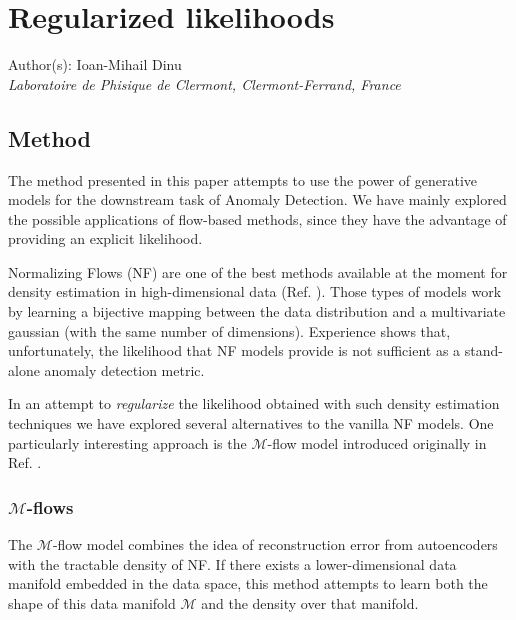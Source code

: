 \documentclass[letterpaper,11pt]{article}
\begin{document}
\section*{Regularized likelihoods}
Author(s): Ioan-Mihail Dinu \\ \textit{Laboratoire de Phisique de Clermont, Clermont-Ferrand, France}\\

\subsection{Method}
\label{sec:method}
The method presented in this paper attempts to use the power of generative models for the downstream task of Anomaly Detection. We have mainly explored the possible applications of flow-based methods, since they have the advantage of providing an explicit likelihood.

Normalizing Flows (NF) are one of the best methods available at the moment for density estimation in high-dimensional data (Ref. \cite{pmlr-v37-rezende15}). Those types of models work by learning a bijective mapping between the data distribution and a multivariate gaussian (with the same number of dimensions). Experience shows that, unfortunately, the likelihood that NF models provide is not sufficient as a stand-alone anomaly detection metric. 

In an attempt to \textit{regularize} the likelihood obtained with such density estimation techniques we have explored several alternatives to the vanilla NF models. One particularly interesting approach is the $\mathcal{M}$-flow model introduced originally in Ref. \cite{Brehmer:2020vwc}. 

\subsubsection{$\mathcal{M}$-flows}

The $\mathcal{M}$-flow model combines the idea of reconstruction error from autoencoders with the tractable density of NF. If there exists a lower-dimensional  data manifold embedded in the data space, this method attempts to learn both the shape of this data manifold $\mathcal{M}$ and the density over that manifold.
\end{document}
